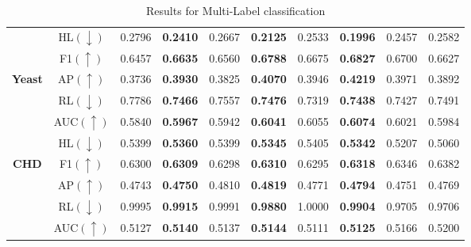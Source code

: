 \documentclass[12pt,a4paper,oneside,english]{report}
\begin{document}
\begin{table}
\begin{tabular}{|c|c|cc|cc|cc|cc|}
        \hline
        ~ & HL$(\downarrow)$ & 0.2796 & \textbf{0.2410} & 0.2667 & \textbf{0.2125} & 0.2533 & \textbf{0.1996} & 0.2457 & 0.2582 \\ 
        ~ & F1$(\uparrow)$ & 0.6457 & \textbf{0.6635} & 0.6560 & \textbf{0.6788} & 0.6675 & \textbf{0.6827} & 0.6700 & 0.6627 \\ 
        \textbf{Yeast} & AP$(\uparrow)$ & 0.3736 & \textbf{0.3930} & 0.3825 & \textbf{0.4070} & 0.3946 & \textbf{0.4219} & 0.3971 & 0.3892 \\ 
        ~ & RL$(\downarrow)$ & 0.7786 & \textbf{0.7466} & 0.7557 & \textbf{0.7476} & 0.7319 & \textbf{0.7438} & 0.7427 & 0.7491 \\ 
        ~ & AUC$(\uparrow)$ & 0.5840 & \textbf{0.5967} & 0.5942 & \textbf{0.6041} & 0.6055 & \textbf{0.6074} & 0.6021 & 0.5984 \\ 
         \hline
        ~ & HL$(\downarrow)$ & 0.5399 & \textbf{0.5360} & 0.5399 & \textbf{0.5345} & 0.5405 & \textbf{0.5342} & 0.5207 & 0.5060 \\ 
        \textbf{CHD} & F1$(\uparrow)$ & 0.6300 & \textbf{0.6309} & 0.6298 & \textbf{0.6310} & 0.6295 & \textbf{0.6318} & 0.6346 & 0.6382 \\ 
        ~ & AP$(\uparrow)$ & 0.4743 & \textbf{0.4750} & 0.4810 & \textbf{0.4819} & 0.4771 & \textbf{0.4794} & 0.4751 & 0.4769 \\ 
        ~ & RL$(\downarrow)$ & 0.9995 & \textbf{0.9915} & 0.9991 & \textbf{0.9880} & 1.0000 & \textbf{0.9904} & 0.9705 & 0.9706 \\ 
        ~ & AUC$(\uparrow)$ & 0.5127 & \textbf{0.5140} & 0.5137 & \textbf{0.5144} & 0.5111 & \textbf{0.5125} & 0.5166 & 0.5200 \\ \hline
    \end{tabular}
    \caption{Results for Multi-Label classification }
    \label{tab:multi_label_results1}
\end{table}
\end{document}
